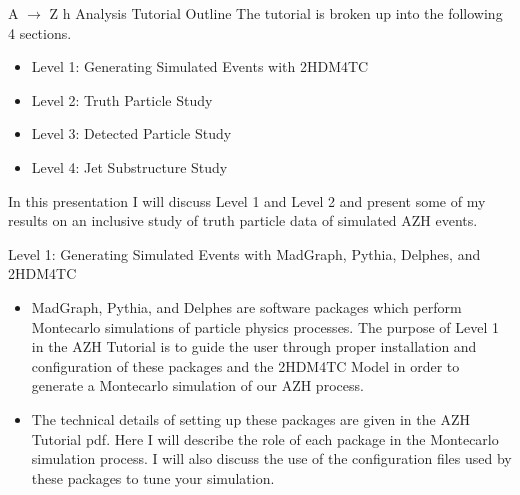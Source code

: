 \documentclass{beamer}
\begin{document}
	\begin{frame}{A $\rightarrow$ Z h Analysis Tutorial Outline}
The tutorial is broken up into the following 4 sections.

\bigskip

		\begin{itemize}
\item<1-> Level 1: Generating Simulated Events with 2HDM4TC
\item<1-> Level 2: Truth Particle Study
\item<1-> Level 3: Detected Particle Study
\item<1-> Level 4: Jet Substructure Study
		\end{itemize}

\bigskip

In this presentation I will discuss Level 1 and Level 2 and present some of my results on an inclusive study of truth particle data of simulated AZH events.
	\end{frame}
	\begin{frame}{Level 1: Generating Simulated Events with MadGraph, Pythia, Delphes, and 2HDM4TC}
		\begin{itemize}
\item<1->MadGraph, Pythia, and Delphes are software packages which perform Montecarlo simulations of particle physics processes. The purpose of Level 1 in the AZH Tutorial is to guide the user through proper installation and configuration of these packages and the 2HDM4TC Model in order to generate a Montecarlo simulation of our AZH process.

\bigskip

\item<1->The technical details of setting up these packages are given in the AZH Tutorial pdf. Here I will describe the role of each package in the Montecarlo simulation process. I will also discuss the use of the configuration files used by these packages to tune your simulation.
		\end{itemize}
	\end{frame}
\end{document}
